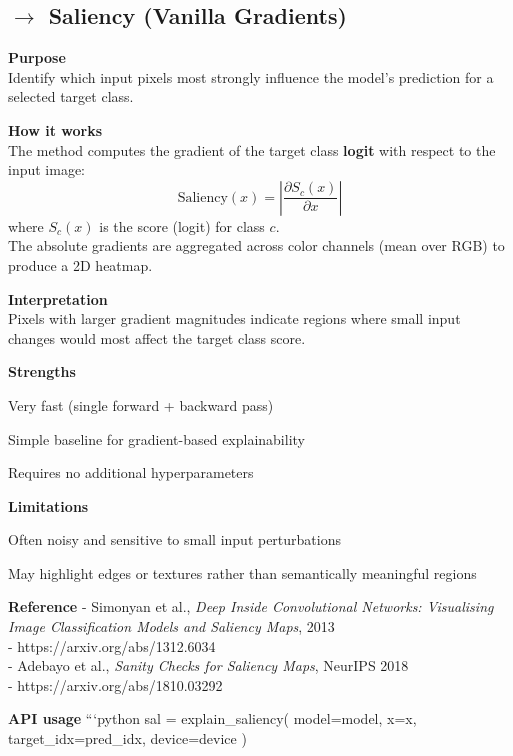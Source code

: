 \documentclass[11pt]{article}
\begin{document}
    \subsection{\texorpdfstring{\(\rightarrow\) Saliency (Vanilla
Gradients)}{\textbackslash rightarrow Saliency (Vanilla Gradients)}}\label{rightarrow-saliency-vanilla-gradients}

\textbf{Purpose}\\
Identify which input pixels most strongly influence the model's
prediction for a selected target class.

\textbf{How it works}\\
The method computes the gradient of the target class \textbf{logit} with
respect to the input image: \[
\text{Saliency}(x) = \left| \frac{\partial S_c(x)}{\partial x} \right|
\] where \(S_c(x)\) is the score (logit) for class \(c\).\\
The absolute gradients are aggregated across color channels (mean over
RGB) to produce a 2D heatmap.

\textbf{Interpretation}\\
Pixels with larger gradient magnitudes indicate regions where small
input changes would most affect the target class score.

\textbf{Strengths}

Very fast (single forward + backward pass)

Simple baseline for gradient-based explainability

Requires no additional hyperparameters

\textbf{Limitations}

Often noisy and sensitive to small input perturbations

May highlight edges or textures rather than semantically meaningful
regions

\textbf{Reference} - Simonyan et al., \emph{Deep Inside Convolutional
Networks: Visualising Image Classification Models and Saliency Maps},
2013\\
- https://arxiv.org/abs/1312.6034\\
- Adebayo et al., \emph{Sanity Checks for Saliency Maps}, NeurIPS 2018\\
- https://arxiv.org/abs/1810.03292

\textbf{API usage} ```python sal = explain\_saliency( model=model, x=x,
target\_idx=pred\_idx, device=device )
\end{document}
